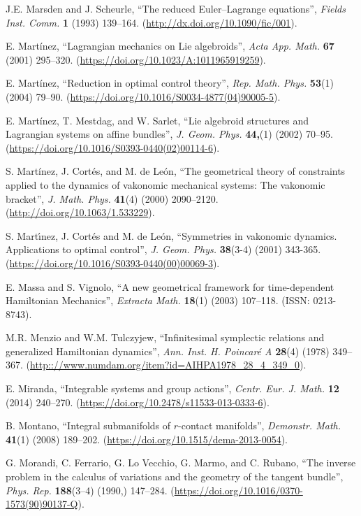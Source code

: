 \documentclass[12pt]{report}
\begin{document}
\begin{thebibliography}{999}
{\rm J.E. Marsden and  J. Scheurle},
``The reduced Euler--Lagrange equations'',
{\sl Fields Inst. Comm.} {\bf 1} (1993) 139--164.
(\url{http://dx.doi.org/10.1090/fic/001}).

E. Mart\'inez,
``Lagrangian mechanics on Lie algebroids'',
{\sl Acta App. Math.} {\bf 67} (2001) 295--320.
(\url{https://doi.org/10.1023/A:1011965919259}).

E. Mart\'inez,
``Reduction in optimal control theory'',
{\sl Rep. Math. Phys.} {\bf 53}(1) (2004) 79--90.
(\url{https://doi.org/10.1016/S0034-4877(04)90005-5}).

E. Mart\' inez, T. Mestdag, and W. Sarlet,
``Lie algebroid structures and Lagrangian systems on affine bundles'',
{\sl J. Geom. Phys.} {\bf 44,}(1) (2002) 70--95.
(\url{https://doi.org/10.1016/S0393-0440(02)00114-6}).

S. Mart\'inez, J. Cort\'es, and M. de Le\'on,
``The geometrical theory of constraints applied to the dynamics of vakonomic mechanical systems: The vakonomic bracket'',
{\sl J. Math. Phys.} {\bf 41}(4) (2000) 2090--2120.
(\url{http://doi.org/10.1063/1.533229}).

{\rm S. Mart\'\i nez, J. Cort\'es and M. de Le\'on},
 ``Symmetries in vakonomic dynamics. Applications to optimal control'',
{\sl J. Geom. Phys.} {\bf 38}(3-4) (2001) 343-365.
(\url{https://doi.org/10.1016/S0393-0440(00)00069-3}).

E. Massa and S. Vignolo,
``A new geometrical framework for time-dependent Hamiltonian Mechanics'',
{\sl Extracta Math.} {\bf 18}(1) (2003) 107--118.
(ISSN: 0213-8743).

M.R. Menzio and W.M. Tulczyjew,
``Infinitesimal symplectic relations and generalized Hamiltonian dynamics'',
{\sl Ann. Inst. H. Poincar\'e A} {\bf 28}(4) (1978) 349--367.
(\url{http:://www.numdam.org/item?id=AIHPA1978_28_4_349_0}).

E. Miranda,
``Integrable systems and group actions'', {\sl Centr. Eur. J. Math.} {\bf 12} (2014) 240--270. (\url{https://doi.org/10.2478/s11533-013-0333-6}).

B. Montano, 
``Integral submanifolds of $r$-contact manifolds'', 
{\sl Demonstr. Math.} {\bf 41}(1) (2008) 189--202.
(\url{https://doi.org/10.1515/dema-2013-0054}).

G. Morandi, C. Ferrario, G. Lo Vecchio, G. Marmo, and C. Rubano,
``The inverse problem in the calculus of variations and the geometry of the tangent bundle'',
{\sl Phys. Rep.} {\bf 188}(3–4) (1990,) 147--284.
(\url{https://doi.org/10.1016/0370-1573(90)90137-Q}).


\end{thebibliography}
\end{document}
